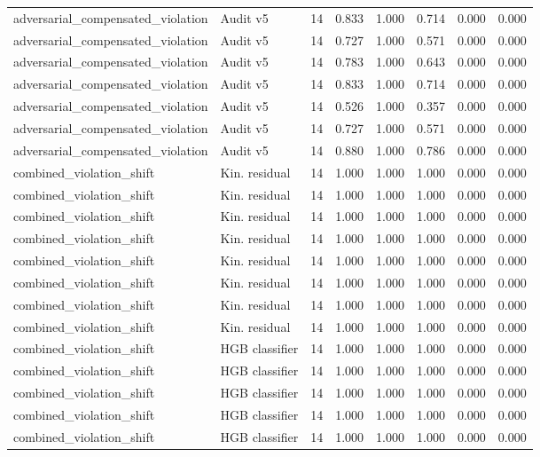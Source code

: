 {\begin{longtable}{llrrrrrr}
adversarial\_compensated\_violation & Audit v5 & 14 & 0.833 & 1.000 & 0.714 & 0.000 & 0.000 \\
adversarial\_compensated\_violation & Audit v5 & 14 & 0.727 & 1.000 & 0.571 & 0.000 & 0.000 \\
adversarial\_compensated\_violation & Audit v5 & 14 & 0.783 & 1.000 & 0.643 & 0.000 & 0.000 \\
adversarial\_compensated\_violation & Audit v5 & 14 & 0.833 & 1.000 & 0.714 & 0.000 & 0.000 \\
adversarial\_compensated\_violation & Audit v5 & 14 & 0.526 & 1.000 & 0.357 & 0.000 & 0.000 \\
adversarial\_compensated\_violation & Audit v5 & 14 & 0.727 & 1.000 & 0.571 & 0.000 & 0.000 \\
adversarial\_compensated\_violation & Audit v5 & 14 & 0.880 & 1.000 & 0.786 & 0.000 & 0.000 \\
combined\_violation\_shift & Kin. residual & 14 & 1.000 & 1.000 & 1.000 & 0.000 & 0.000 \\
combined\_violation\_shift & Kin. residual & 14 & 1.000 & 1.000 & 1.000 & 0.000 & 0.000 \\
combined\_violation\_shift & Kin. residual & 14 & 1.000 & 1.000 & 1.000 & 0.000 & 0.000 \\
combined\_violation\_shift & Kin. residual & 14 & 1.000 & 1.000 & 1.000 & 0.000 & 0.000 \\
combined\_violation\_shift & Kin. residual & 14 & 1.000 & 1.000 & 1.000 & 0.000 & 0.000 \\
combined\_violation\_shift & Kin. residual & 14 & 1.000 & 1.000 & 1.000 & 0.000 & 0.000 \\
combined\_violation\_shift & Kin. residual & 14 & 1.000 & 1.000 & 1.000 & 0.000 & 0.000 \\
combined\_violation\_shift & Kin. residual & 14 & 1.000 & 1.000 & 1.000 & 0.000 & 0.000 \\
combined\_violation\_shift & HGB classifier & 14 & 1.000 & 1.000 & 1.000 & 0.000 & 0.000 \\
combined\_violation\_shift & HGB classifier & 14 & 1.000 & 1.000 & 1.000 & 0.000 & 0.000 \\
combined\_violation\_shift & HGB classifier & 14 & 1.000 & 1.000 & 1.000 & 0.000 & 0.000 \\
combined\_violation\_shift & HGB classifier & 14 & 1.000 & 1.000 & 1.000 & 0.000 & 0.000 \\
combined\_violation\_shift & HGB classifier & 14 & 1.000 & 1.000 & 1.000 & 0.000 & 0.000 \\

\end{longtable}}
